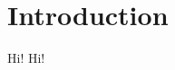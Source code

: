 \documentclass[10pt,twocolumn]{article}
\begin{document}
\section{Introduction}
Hi! Hi!
\end{document}
